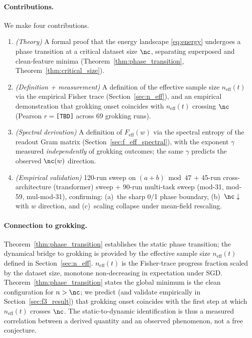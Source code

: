 
\paragraph{Contributions.}
We make four contributions.
\begin{enumerate}
    \item[\textbf{C1.}] \emph{(Theory)} A formal proof that the energy landscape \eqref{eq:energy} undergoes a phase transition at a critical dataset size $\nc$, separating superposed and clean-feature minima (Theorem~\ref{thm:phase_transition}, Theorem~\ref{thm:critical_size}).
    \item[\textbf{C2.}] \emph{(Definition + measurement)} A definition of the effective sample size $n_{\text{eff}}(t)$ via the empirical Fisher trace (Section~\ref{sec:n_eff}), and an empirical demonstration that grokking onset coincides with $n_{\text{eff}}(t)$ crossing $\nc$ (Pearson $r = $\texttt{[TBD]} across 69 grokking runs).
    \item[\textbf{C3.}] \emph{(Spectral derivation)} A definition of $F_{\text{eff}}(w)$ via the spectral entropy of the readout Gram matrix (Section~\ref{sec:f_eff_spectral}), with the exponent $\gamma$ measured \emph{independently} of grokking outcomes; the same $\gamma$ predicts the observed $\nc(w)$ direction.
    \item[\textbf{C4.}] \emph{(Empirical validation)} 120-run sweep on $(a+b)\bmod 47$ + 45-run cross-architecture (transformer) sweep + 90-run multi-task sweep (mod-31, mod-59, mul-mod-31), confirming: (a)~the sharp 0/1 phase boundary, (b)~$\nc\downarrow$ with $w$ direction, and (c)~scaling collapse under mean-field rescaling.
\end{enumerate}



\paragraph{Connection to grokking.}
Theorem~\ref{thm:phase_transition} establishes the static phase transition; the dynamical bridge to grokking is provided by the effective sample size $n_{\text{eff}}(t)$ defined in Section~\ref{sec:n_eff}.
$n_{\text{eff}}(t)$ is the Fisher-trace progress fraction scaled by the dataset size, monotone non-decreasing in expectation under SGD.
Theorem~\ref{thm:phase_transition} states the global minimum is the clean configuration for $n > \nc$; we predict (and validate empirically in Section~\ref{sec:f3_result}) that grokking onset coincides with the first step at which $n_{\text{eff}}(t)$ crosses $\nc$.
The static-to-dynamic identification is thus a measured correlation between a derived quantity and an observed phenomenon, not a free conjecture.


